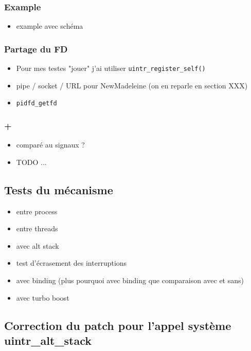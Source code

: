\subsubsection{Example}

\begin{itemize}
  \item example avec schéma
\end{itemize}

\subsubsection{Partage du FD}

\begin{itemize}
  \item Pour mes testes "jouer" j'ai utiliser \verb|uintr_register_self()|
  \item pipe / socket / URL pour NewMadeleine (on en reparle en section XXX)
  \item \verb|pidfd_getfd|
\end{itemize}

\subsubsection{+}

\begin{itemize}
  \item comparé au signaux ?
  \item TODO ...
\end{itemize}

\subsection{Tests du mécanisme}

\begin{itemize}
  \item entre process
  \item entre threads
  \item avec alt stack
  \item test d'écrasement des interruptions
  \item avec binding (plus pourquoi avec binding que comparaison avec et sans)
  \item avec turbo boost
\end{itemize}

\subsection{Correction du patch pour l'appel système uintr_alt_stack}

